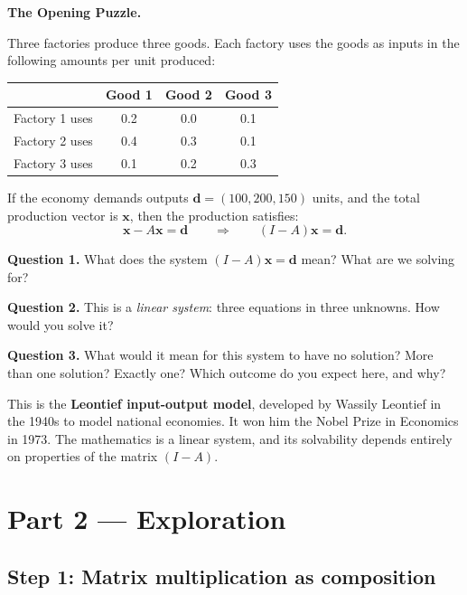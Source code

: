 \documentclass[12pt, a4paper]{article}
\begin{document}
\begin{puzzlebox}
\textbf{The Opening Puzzle.}

Three factories produce three goods. Each factory uses the goods as inputs in the following amounts per unit produced:

\begin{center}
\begin{tabular}{lccc}
\toprule
               & Good 1 & Good 2 & Good 3 \\
\midrule
Factory 1 uses & 0.2    & 0.0    & 0.1    \\
Factory 2 uses & 0.4    & 0.3    & 0.1    \\
Factory 3 uses & 0.1    & 0.2    & 0.3    \\
\bottomrule
\end{tabular}
\end{center}

If the economy demands outputs $\mathbf{d} = (100, 200, 150)$ units, and the total production vector is $\mathbf{x}$, then the production satisfies:
\[
  \mathbf{x} - A\mathbf{x} = \mathbf{d} \qquad \Longrightarrow \qquad (I - A)\mathbf{x} = \mathbf{d}.
\]

\textbf{Question 1.} What does the system $(I-A)\mathbf{x} = \mathbf{d}$ mean? What are we solving for?

\textbf{Question 2.} This is a \emph{linear system}: three equations in three unknowns. How would you solve it?

\textbf{Question 3.} What would it mean for this system to have no solution? More than one solution? Exactly one? Which outcome do you expect here, and why?
\end{puzzlebox}

\medskip
This is the \textbf{Leontief input-output model}, developed by Wassily Leontief in the 1940s to model national economies. It won him the Nobel Prize in Economics in 1973. The mathematics is a linear system, and its solvability depends entirely on properties of the matrix $(I-A)$.

\section{Part 2 \texorpdfstring{---}{--} Exploration}

\subsection{Step 1: Matrix multiplication as composition}
\end{document}
